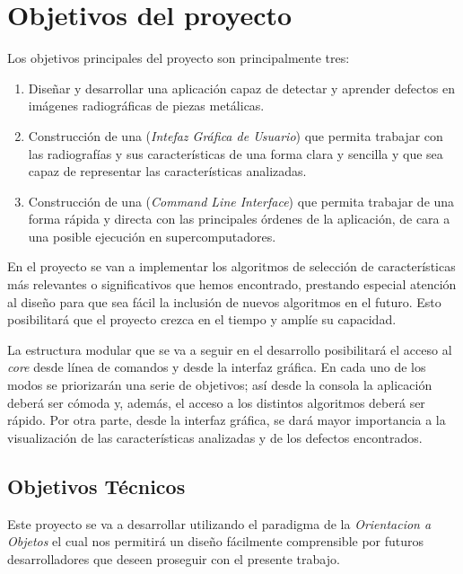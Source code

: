 \chapter{Objetivos del proyecto}

Los objetivos principales del proyecto son principalmente tres:
\begin{enumerate}
 \item Diseñar y desarrollar una aplicación capaz de detectar y aprender defectos en imágenes radiográficas de piezas metálicas.
 \item Construcción de una \gui{} (\textit{Intefaz Gráfica de Usuario}) que permita trabajar con las radiografías y sus características de una forma clara y sencilla y que sea capaz de representar las características analizadas.
 \item Construcción de una \cli{} (\textit{Command Line Interface}) que permita trabajar de una forma rápida y directa con las principales órdenes de la aplicación, de cara a una posible ejecución en supercomputadores.
\end{enumerate}

En el proyecto se van a implementar los algoritmos de selección de características más relevantes o significativos que hemos encontrado, prestando especial atención al diseño para que sea fácil la inclusión de nuevos algoritmos en el futuro. Esto posibilitará que el proyecto crezca en el tiempo y amplíe su capacidad.

La estructura modular que se va a seguir en el desarrollo posibilitará el acceso al \textit{core} desde línea de comandos y desde la interfaz gráfica. En cada uno de los modos se priorizarán una serie de objetivos; así desde la consola la aplicación deberá ser cómoda y, además, el acceso a los distintos algoritmos deberá ser rápido. Por otra parte, desde la interfaz gráfica, se dará mayor importancia a la visualización de las características analizadas y de los defectos encontrados.

\section{Objetivos Técnicos}
Este proyecto se va a desarrollar utilizando el paradigma de la \textit{Orientacion a Objetos} el cual nos permitirá un diseño fácilmente comprensible por futuros desarrolladores que deseen proseguir con el presente trabajo. 

